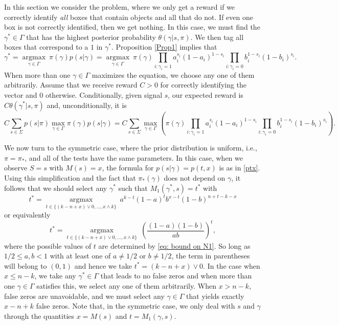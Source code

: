 \documentclass[a4paper,11pt]{article}
\begin{document}
In this section we consider the problem, where we only get a reward if we correctly identify {\em all} boxes that contain objects and all that do not.  If even one box is not correctly identified, then we get nothing. In this case, we must find the $\gamma^*\in\Gamma$ that has the highest posterior probability $\theta(\gamma|s,\pi)$. We then tag all boxes that correspond to a $1$ in $\gamma^*$. Proposition \ref{Prop1} implies that
$$
\gamma^* = \underset{\gamma\in\Gamma}{\operatorname{argmax}}\ \pi(\gamma)p(s|\gamma) =\underset{\gamma\in\Gamma}{\operatorname{argmax}}\ \pi(\gamma)\prod_{i: \gamma_i=1}a_i^{s_i}(1-a_i)^{1-s_i}\prod_{i: \gamma_i=0}b_i^{1-s_i}(1-b_i)^{s_i}.
$$
When more than one $\gamma\in\Gamma$ maximizes the equation, we choose any one of them arbitrarily. Assume that we receive reward $C>0$ for correctly identifying the vector and $0$ otherwise. Conditionally, given signal $s$, our expected reward is $C \theta(\gamma^*|s,\pi)$ and, unconditionally, it is
$$
C \sum_{s\in\Sigma} p(s|\pi)\max_{\gamma\in\Gamma} \pi(\gamma)p(s|\gamma) = C \sum_{s\in\Sigma} \max_{\gamma\in\Gamma}\left( \pi(\gamma)\prod_{i: \gamma_i=1}a_i^{s_i}(1-a_i)^{1-s_i}\prod_{i: \gamma_i=0}b_i^{1-s_i}(1-b_i)^{s_i} \right).
$$

We now turn to the symmetric case, where the prior distribution is uniform, i.e., $\pi=\pi_*$, and all of the tests have the same parameters. In this case, when we observe $S=s$ with $M(s) =x$, the formula for $p(s|\gamma)=p(t,x)$ is as in \eqref{ptx}. Using this simplification and the fact that $\pi_*(\gamma)$ does not depend on $\gamma$, it follows that we should select any $\gamma^*$ such that $M_1(\gamma^*,s)=t^*$ with
$$
t^* = \underset{t\in\{(k-n+x)\vee0,\dots,x\wedge k\}}{\operatorname{argmax}}\ a^{k-t}(1-a)^{t}b^{x-t}(1-b)^{n+t-k-x}
$$
or equivalently
$$
t^* = \underset{t\in\{(k-n+x)\vee0,\dots,x\wedge k\}}{\operatorname{argmax}}\ \left(\frac{(1-a)(1-b)}{ab}\right)^{t},
$$
where the possible values of $t$ are determined by \eqref{eq: bound on N1}. So long as $1/2\le a,b<1$ with at least one of $a\ne1/2$ or $b\ne1/2$, the term in parentheses will belong to $(0,1)$ and hence we take $t^*=(k-n+x)\vee0$. In the case when $x\le n-k$, we take any $\gamma^*\in\Gamma$ that leads to no false zeros and when more than one $\gamma\in\Gamma$ satisfies this, we select any one of them arbitrarily. When $x>n-k$, false zeros are unavoidable, and we must select any $\gamma\in\Gamma$ that yields exactly $x-n+k$ false zeros. Note that, in the symmetric case, we only deal with $s$ and $\gamma$ through the quantities $x=M(s)$ and $t=M_1(\gamma,s)$.
\end{document}
